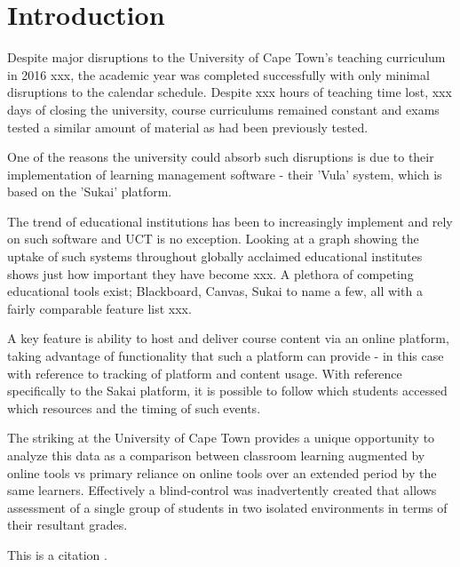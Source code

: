 \section{Introduction}
Despite major disruptions to the University of Cape Town's teaching curriculum in 2016 xxx, the academic year was completed successfully with only minimal disruptions to the calendar schedule. Despite xxx hours of teaching time lost, xxx days of closing the university, course curriculums remained constant and exams tested a similar amount of material as had been previously tested.

One of the reasons the university could absorb such disruptions is due to their implementation of learning management software - their 'Vula' system, which is based on the 'Sukai' platform.

The trend of educational institutions has been to increasingly implement and rely on such software and UCT is no exception. Looking at a graph showing the uptake of such systems throughout globally acclaimed educational institutes shows just how important they have become xxx. A plethora of competing educational tools exist; Blackboard, Canvas, Sukai to name a few, all with a fairly comparable feature list xxx.

A key feature is ability to host and deliver course content via an online platform, taking advantage of functionality that such a platform can provide - in this case with reference to tracking of platform and content usage. With reference specifically to the Sakai platform, it is possible to follow which students accessed which resources and the timing of such events.

The striking at the University of Cape Town provides a unique opportunity to analyze this data as a comparison between classroom learning augmented by online tools vs primary reliance on online tools over an extended period by the same learners. Effectively a blind-control was inadvertently created that allows assessment of a single group of students in two isolated environments in terms of their resultant grades.

This is a citation \cite{bower16}.